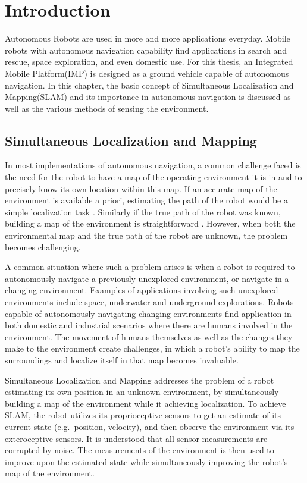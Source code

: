 \chapter{Introduction} 
	
	Autonomous Robots are used in more and more applications everyday. Mobile robots with autonomous navigation capability find applications in search and rescue, space exploration, and even domestic use\cite{search1,search2,marsRover}. For this thesis, an Integrated Mobile Platform(IMP) is designed as a ground vehicle capable of autonomous navigation. In this chapter, the basic concept of Simultaneous Localization and Mapping(SLAM) and its importance in autonomous navigation is discussed as well as the various methods of sensing the environment.
	
	\section{Simultaneous Localization and Mapping}
	
	In most implementations of autonomous navigation, a common challenge faced is the need for the robot to have a map of the operating environment it is in and to precisely know its own location within this map. If an accurate map of the environment is available a priori, estimating the path of the robot would be a simple localization task \cite{Thrun1999}. Similarly if the true path of the robot was known, building a map of the environment is straightforward \cite{Tripathi2014,lakemeyer2003}. However, when both the environmental map and the true path of the robot are unknown, the problem becomes challenging.
	
	A common situation where such a problem arises is when a robot is required to autonomously navigate a previously unexplored environment, or navigate in a changing environment. Examples of  applications involving such unexplored environments include space, underwater and underground explorations\cite{marsRover,mineMapping,underwaterSLAM}. Robots capable of autonomously navigating changing environments find application in both domestic and industrial scenarios where there are humans involved in the environment. The movement of humans themselves as well as the changes they make to the environment create challenges, in which a robot's ability to map the surroundings and localize itself in that map becomes invaluable. 
	
	Simultaneous Localization and Mapping addresses the problem of a robot estimating its own position in an unknown environment, by simultaneously building a map of the environment while it achieving localization. To achieve SLAM, the robot utilizes its proprioceptive sensors to get an estimate of its current state (e.g.\, position, velocity), and then observe the environment via its exteroceptive sensors. It is understood that all sensor measurements are corrupted by noise. The measurements of the environment is then used to improve upon the estimated state while simultaneously improving the robot's map of the environment. 
	
